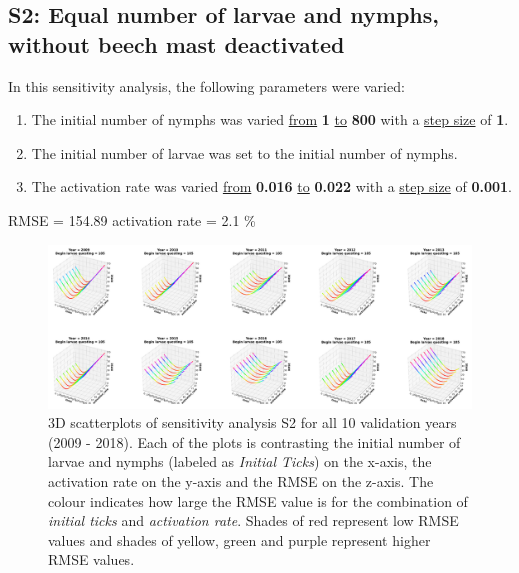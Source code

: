 \documentclass[a4paper, 11pt]{scrartcl}
\begin{document}
\newpage
\subsection{S2: Equal number of larvae and nymphs, without beech mast deactivated}
In this sensitivity analysis, the following parameters were varied:

\begin{enumerate}
\item The initial number of nymphs was varied \underline{from} \textbf{1} \underline{to} \textbf{800} with a \underline{step size} of \textbf{1}.
\item The initial number of larvae was set to the initial number of nymphs.
\item The activation rate was varied \underline{from} \textbf{0.016} \underline{to} \textbf{0.022} with a \underline{step size} of \textbf{0.001}.
\end{enumerate}

RMSE = 154.89
activation rate = 2.1 \%

\begin{figure}[h!]
\centering
\includegraphics[width=1.0\textwidth]{figures/initial_ticks_without_beech_error}
\caption{3D scatterplots of sensitivity analysis S2 for all 10 validation years (2009 - 2018). Each of the plots is contrasting the initial number of larvae and nymphs
(labeled as \textit{Initial Ticks}) on the x-axis, the activation rate on the y-axis and the RMSE on the z-axis. The colour indicates how large the RMSE value is for the
combination of \textit{initial ticks} and \textit{activation rate}. Shades of red represent low RMSE values and shades of yellow, green and purple represent higher RMSE values.}
\label{fig:initial_ticks_without_beech_error}
\end{figure}
\end{document}
